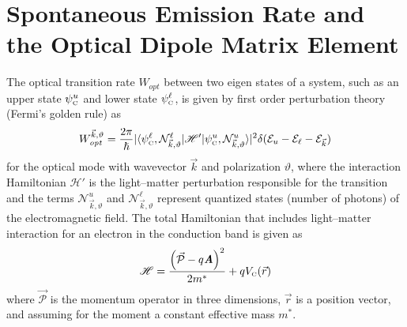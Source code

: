 \documentclass[12pt]{report}
\begin{document}


\section{Spontaneous Emission Rate and the Optical Dipole Matrix Element}

The optical transition rate $W_\textit{opt}$ between two eigen states of a system, such as an upper state $\psi_{\textnormal{\tiny{C}}}^u$ and lower state $\psi_{\textnormal{\tiny{C}}}^\ell$, is given by first order perturbation theory (Fermi's golden rule) as \cite{CohenTannoudji}
\begin{equation}
\label{chpt1eqn:fermi_golden_rule1}
W_\textit{opt}^{\vec{k},\vartheta} = \frac{2 \pi}{\hslash} \vert\langle \psi_\tn{\tiny{C}}^\ell,\mathcal{N}^\ell_{\vec{k},\vartheta} \vert \mathscr{H}'\vert \psi_\tn{\tiny{C}}^u,\mathcal{N}^u_{\vec{k},\vartheta}  \rangle\vert^2 \delta(\EE_u-\EE_\ell-\EE_{\vec{k}})
\end{equation}
for the optical mode with wavevector $\vec{k}$ and polarization $\vartheta$,
where the interaction Hamiltonian $\mathscr{H}'$ is the light--matter perturbation responsible for the transition and the terms $\mathcal{N}^u_{\vec{k},\vartheta}$ and $\mathcal{N}^\ell_{\vec{k},\vartheta}$ represent quantized states (number of photons) of the electromagnetic field. %
The total Hamiltonian that includes light--matter interaction for an electron in the conduction band is given as \cite{CohenTannoudji}
\begin{equation}
\label{chpt1eqn:long-hamiltonian1}
\mathscr{H}=\frac{\left(\vec{\mathcal{P}}-q \textit{\textbf{A}}\right)^2}{2 m^*} + q V_{\textnormal{\tiny{C}}}(\vec{r})
\end{equation}
where $\vec{\mathcal{P}}$ is the momentum operator in three dimensions, $\vec{r}$ is a position vector, and assuming for the moment a constant effective mass $m^*$.
\end{document}
